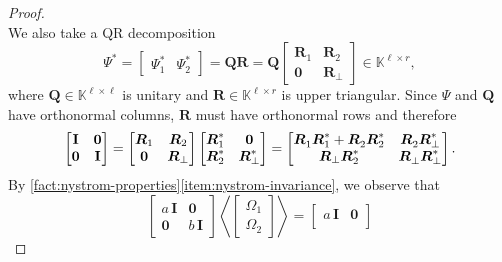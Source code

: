 \documentclass[11pt]{article}
\newcommand{\field}{\mathbb{K}}
\newcommand{\mat}[1]{\boldsymbol{#1}}
\newcommand{\Id}{\mathbf{I}}
\theoremstyle{definition}
\numberwithin{equation}{section}
\begin{document}
\begin{proof}
\begin{equation*}
    \end{equation*}
    We also take a QR decomposition
    \begin{equation*}
    \mat{\varPsi}^* = \begin{bmatrix} \mat{\varPsi}_1^* & \mat{\varPsi}_2^* \end{bmatrix}
    = \mat{Q} \mat{R}
    = \mat{Q} \begin{bmatrix} \mat{R}_1 & \mat{R}_2 \\ \mat{0} & \mat{R}_{\perp} \end{bmatrix} \in \field^{\ell \times r},
    \end{equation*}
    where $\mat{Q} \in \field^{\ell \times \ell}$ is unitary and $\mat{R} \in \field^{\ell \times r}$ is upper triangular.
    Since $\mat{\varPsi}$ and $\mat{Q}$ have orthonormal columns, $\mat{R}$ must have orthonormal rows and therefore
    \begin{equation}
    \label{eq:orth_rows}
    	\begin{bmatrix} \Id & \mat{0} \\ \mat{0} & \Id \end{bmatrix}
	= \begin{bmatrix} \mat{R}_1 & \mat{R}_2 \\ \mat{0} & \mat{R}_{\perp} \end{bmatrix}
	\begin{bmatrix} \mat{R}_1^* & \mat{0} \\
	\mat{R}_2^* & \mat{R}_{\perp}^* \end{bmatrix}
	= \begin{bmatrix} \mat{R}_1^{\vphantom{*}} \mat{R}_1^* + \mat{R}_2^{\vphantom{*}} \mat{R}_2^* & \mat{R}_2^{\vphantom{*}} \mat{R}_{\perp}^* \\ \mat{R}_{\perp} \mat{R}_2^* & \mat{R}_{\perp}^{\vphantom{*}} \mat{R}_{\perp}^* \end{bmatrix}.    \end{equation}
    By \cref{fact:nystrom-properties}\ref{item:nystrom-invariance}, we observe that
    \begin{equation*}
        \begin{bmatrix} a\,\Id & \mat{0} \\
        \mat{0} & b\,\Id
        \end{bmatrix} \left\langle \begin{bmatrix} \mat{\varOmega}_1 \\ \mat{\varOmega}_2 \end{bmatrix} \right\rangle
        = \begin{bmatrix} a\,\Id & \mat{0} \\

\end{bmatrix}
\end{equation*}
\end{proof}
\end{document}
